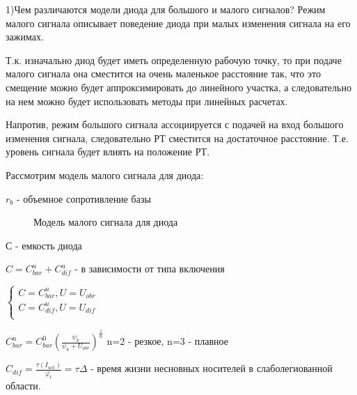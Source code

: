 \documentclass[12pt,a4paper]{article}
\begin{document}
1)Чем различаются модели диода для большого и малого сигналов?
Режим малого сигнала описывает  поведение диода при малых изменения сигнала на его зажимах.
	
	Т.к. изначально диод будет иметь определенную рабочую точку, то при подаче малого сигнала она сместится на очень маленькое расстояние так, что это смещение можно будет аппроксимировать до линейного участка, а следовательно на нем можно будет использовать методы при линейных расчетах.
	
	Напротив, режим большого сигнала ассоциируется с подачей на вход большого изменения сигнала, следовательно РТ сместится на достаточное расстояние. Т.е. уровень сигнала будет влиять на положение РТ.
	
	Рассмотрим модель малого сигнала для диода:
	
	$r_b$ - объемное сопротивление базы
	\begin{center}

	\begin{figure}[h!]
		\caption{Модель малого сигнала для диода}	
		\label{VD1}
	\end{figure}
\end{center}
С - емкость диода

$
	C=C^u_{bar}+C^u_{dif}
$ - в зависимости от типа включения

$
\left\{
	\begin{aligned}
		C=C^u_{bar},U=U_{obr}\\  
  		C=C^u_{dif},U=U_{dif}\\
  	\end{aligned}
\right.
$

$
C^u_{bar}=C^0_{bar}\left(\frac{\psi_k}{\psi_k + U_{obr}}\right)^\frac1n
$
n=2 - резкое, n=3 - плавное

$C_{dif}=\frac{\tau(I_{ust})}{\varphi_t}=\tau\Delta$ - время жизни несновных носителей в слаболегиованной области.
\end{document}
